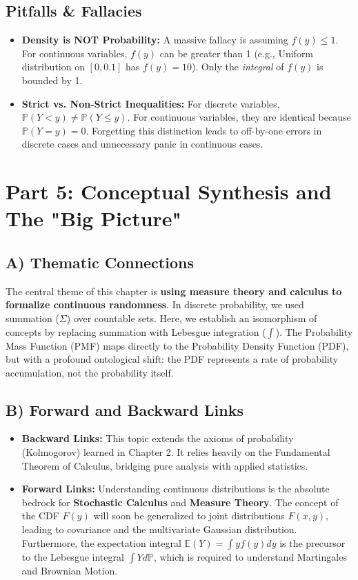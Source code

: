 \documentclass[11pt, a4paper]{article}
\theoremstyle{definition}
\theoremstyle{remark}
\newcommand{\E}{\mathbb{E}}
\newcommand{\Prob}{\mathbb{P}}
\begin{document}
\subsection{Pitfalls \& Fallacies}
\begin{itemize}
    \item \textbf{Density is NOT Probability:} A massive fallacy is assuming $f(y) \le 1$. For continuous variables, $f(y)$ can be greater than 1 (e.g., Uniform distribution on $[0, 0.1]$ has $f(y) = 10$). Only the \textit{integral} of $f(y)$ is bounded by 1.
    \item \textbf{Strict vs. Non-Strict Inequalities:} For discrete variables, $\Prob(Y < y) \neq \Prob(Y \le y)$. For continuous variables, they are identical because $\Prob(Y = y) = 0$. Forgetting this distinction leads to off-by-one errors in discrete cases and unnecessary panic in continuous cases.
\end{itemize}

\newpage
\section{Part 5: Conceptual Synthesis and The "Big Picture"}

\subsection{A) Thematic Connections}
The central theme of this chapter is \textbf{using measure theory and calculus to formalize continuous randomness}. In discrete probability, we used summation ($\Sigma$) over countable sets. Here, we establish an isomorphism of concepts by replacing summation with Lebesgue integration ($\int$). The Probability Mass Function (PMF) maps directly to the Probability Density Function (PDF), but with a profound ontological shift: the PDF represents a rate of probability accumulation, not the probability itself.

\subsection{B) Forward and Backward Links}
\begin{itemize}
    \item \textbf{Backward Links:} This topic extends the axioms of probability (Kolmogorov) learned in Chapter 2. It relies heavily on the Fundamental Theorem of Calculus, bridging pure analysis with applied statistics.
    \item \textbf{Forward Links:} Understanding continuous distributions is the absolute bedrock for \textbf{Stochastic Calculus} and \textbf{Measure Theory}. The concept of the CDF $F(y)$ will soon be generalized to joint distributions $F(x,y)$, leading to covariance and the multivariate Gaussian distribution. Furthermore, the expectation integral $\E(Y) = \int y f(y) dy$ is the precursor to the Lebesgue integral $\int Y d\Prob$, which is required to understand Martingales and Brownian Motion.
\end{itemize}
\end{document}
